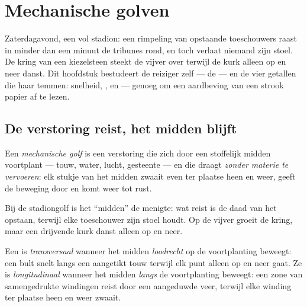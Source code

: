 \chapter{Mechanische golven}\label{ch:g12:mechanical-waves}

Zaterdagavond, een vol stadion: een rimpeling van opstaande toeschouwers
raast in minder dan een minuut de tribunes rond, en toch verlaat niemand
zijn stoel. De kring van een kiezelsteen steekt de vijver over terwijl de
kurk alleen op en neer danst. Dit hoofdstuk bestudeert de reiziger zelf
--- de  --- en de vier getallen die haar temmen: snelheid,
,  en  --- genoeg om een aardbeving van een
strook papier af te lezen.

\section{De verstoring reist, het midden blijft}

\begin{definition}\label{def:g12:mechanical-waves:wave}
Een \emph{mechanische golf} is een verstoring die
zich door een stoffelijk midden voortplant --- touw, water, lucht,
gesteente --- en die  draagt \emph{zonder materie te vervoeren}:
elk stukje van het midden zwaait even ter plaatse heen en weer, geeft de
beweging door en komt weer tot rust.
\end{definition}

\begin{example}\label{ex:g12:mechanical-waves:transport}
Bij de stadiongolf is het ``midden'' de menigte: wat reist is de daad van
het opstaan, terwijl elke toeschouwer zijn stoel houdt. Op de vijver
groeit de kring, maar een drijvende kurk danst alleen op en neer.
\end{example}

\begin{definition}\label{def:g12:mechanical-waves:transverse}
Een  is \emph{transversaal} wanneer het
midden \emph{loodrecht} op de voortplanting beweegt: een bult snelt langs
een aangetikt touw terwijl elk punt alleen op en neer gaat. Ze is
\emph{longitudinaal} wanneer het midden
\emph{langs} de voortplanting beweegt: een zone van samengedrukte
windingen reist door een aangeduwde veer, terwijl elke winding ter plaatse
heen en weer zwaait.
\end{definition}

